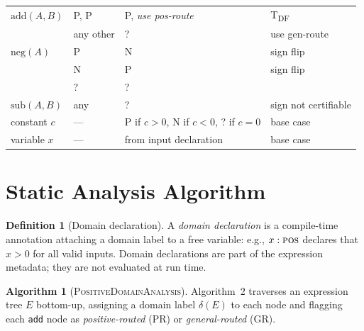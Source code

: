 \documentclass[12pt,a4paper]{article}
\theoremstyle{definition}
\newtheorem{definition}[theorem]{Definition}
\newtheorem{algorithm}[theorem]{Algorithm}
\newcommand{\POS}{\textsc{pos}}
\begin{document}
\begin{longtable}{@{}L{3.2cm}L{3.2cm}C{2.5cm}L{4.5cm}@{}}
$\mathrm{add}(A,B)$ & P, P              & P, \emph{use pos-route} & T\textsubscript{DF} \\
                 & any other             & ?   & use gen-route \\[3pt]
$\mathrm{neg}(A)$ & P                   & N   & sign flip \\
                  & N                   & P   & sign flip \\
                  & ?                   & ?   & \\[3pt]
$\mathrm{sub}(A,B)$ & any              & ?   & sign not certifiable \\[3pt]
constant $c$      & ---                 & P if $c>0$, N if $c<0$, ? if $c=0$ & base case \\[3pt]
variable $x$      & ---                 & from input declaration & base case \\
\end{longtable}

\section{Static Analysis Algorithm}
\label{sec:algorithm}

\begin{definition}[Domain declaration]
\label{def:domain-decl}
A \emph{domain declaration} is a compile-time annotation attaching a domain
label to a free variable: e.g., $x : \POS$ declares that $x > 0$ for all valid
inputs.  Domain declarations are part of the expression metadata; they are not
evaluated at run time.
\end{definition}

\begin{algorithm}[\textsc{PositiveDomainAnalysis}]
\label{alg:PDA}
Algorithm~2 traverses an expression tree $E$ bottom-up, assigning a domain
label $\delta(E)$ to each node and flagging each \texttt{add} node as
\emph{positive-routed} (PR) or \emph{general-routed} (GR).
\end{algorithm}
\end{document}
